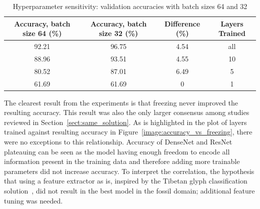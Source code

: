 \documentclass[english,twoside,openright]{UH_DS_MSc}
\begin{document}
\begin{table}[ht]
    \centering
        \begin{tabular}{|c|c|c|c|}
            \hline
            \textbf{Accuracy, batch size 64 (\%)} & \textbf{Accuracy, batch size 32 (\%)} & \textbf{Difference} (\%) & \textbf{Layers Trained} \\ \hline
            92.21 & 96.75 & 4.54 & all \\\hline
            88.96 & 93.51 & 4.55 & 10  \\\hline
            80.52 & 87.01 & 6.49 & 5   \\\hline
            61.69 & 61.69 & 0 & 1   \\\hline
        \end{tabular}
    \caption{Hyperparameter sensitivity: validation accuracies with batch sizes 64 and 32}
    \label{table:hyperparameter_sensitivity}
\end{table}

The clearest result from the experiments is that freezing never improved the resulting accuracy. This result was 
also the only larger consensus among studies reviewed in Section~\ref{sect:same_solution}.
As is highlighted in the plot of layers trained against resulting accuracy in Figure~\ref{image:accuracy_vs_freezing},
there were no exceptions to this relationship. Accuracy of DenseNet and ResNet plateauing can be seen as 
the model having enough freedom to encode all information present in the training data and therefore adding 
more trainable parameters did not increase accuracy. To interpret the correlation, the hypothesis that using a feature 
extractor as is, inspired by the Tibetan glyph classification solution~\cite{4zhaoTibetan}, did not result in the 
best model in the fossil domain; additional feature tuning was needed.
\end{document}
